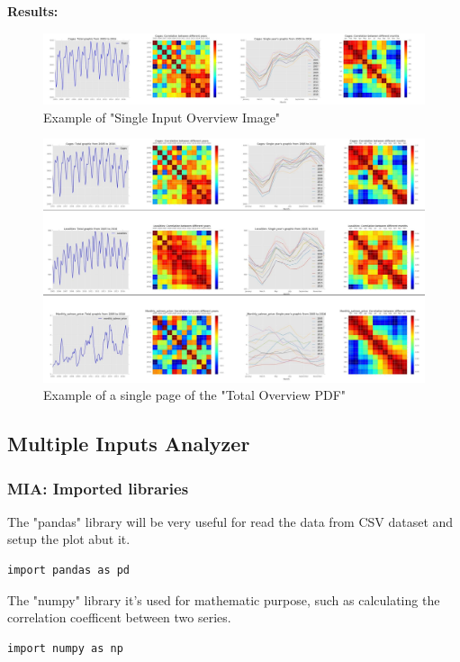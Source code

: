 \textbf{Results:}
\begin{figure}[H]
	\centering
    \includegraphics[width=1\textwidth]{Files/Cages_Overview.jpg}
    \caption{Example of "Single Input Overview Image"}
\end{figure}

\begin{figure}[H]
	\centering
    \includegraphics[width=1\textwidth]{Files/Total_Overview.jpg}
    \caption{Example of a single page of the "Total Overview PDF"}
\end{figure}





\newpage
\subsection{Multiple Inputs Analyzer}

\newpage
\subsubsection{MIA: Imported libraries}
The "pandas" library will be very useful for read the data from CSV dataset and setup the plot abut it.
\begin{lstlisting}
import pandas as pd
\end{lstlisting}

The "numpy" library it's used for mathematic purpose, such as calculating the correlation coefficent between two series.
\begin{lstlisting}
import numpy as np
\end{lstlisting}
 
